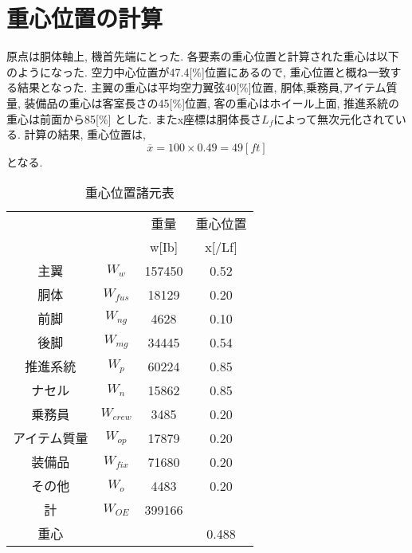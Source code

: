 \documentclass[class=article, crop=false, dvipdfmx, fleqn]{standalone}
\begin{document}
\section{重心位置の計算}
原点は胴体軸上, 機首先端にとった. 各要素の重心位置と計算された重心は以下のようになった.
空力中心位置が47.4[$\%$]位置にあるので, 重心位置と概ね一致する結果となった.
主翼の重心は平均空力翼弦40[$\%$]位置, 胴体,乗務員,アイテム質量, 装備品の重心は客室長さの45[$\%$]位置,
客の重心はホイール上面, 推進系統の重心は前面から85[$\%$]
とした. またx座標は胴体長さ$L_f$によって無次元化されている.
計算の結果, 重心位置は,
\begin{equation}
  \overline{x} = 100 \times 0.49 = 49[ft]
\end{equation}
となる.
\begin{table}[H]
  \begin{center}
  \caption{重心位置諸元表}
  \label{tab::gravity_center}
  \begin{tabularx}{10cm}{CCCC}
    \hline
     &  & 重量 & 重心位置 \\
     &  & w[Ib] & x[/Lf] \\ \hline
  主翼 & $W_w$ & 157450 & 0.52 \\
  胴体 & $W_{fus}$ & 18129 & 0.20 \\
  前脚 & $W_{ng}$ & 4628 & 0.10 \\
  後脚 & $W_{mg}$ & 34445 & 0.54 \\
  推進系統 & $W_{p}$ & 60224 & 0.85 \\
  ナセル & $W_{n}$ & 15862 & 0.85 \\
  乗務員 & $W_{crew}$ & 3485 & 0.20 \\
  アイテム質量 & $W_{op}$ & 17879 & 0.20 \\
  装備品 & $W_{fix}$ & 71680 & 0.20 \\
  その他 & $W_o$ & 4483 & 0.20 \\ \hline
  計 & $W_{OE}$ & 399166 &  \\
  重心 & & & 0.488 \\
\end{tabularx}
\end{center}
\end{table}
\end{document}
